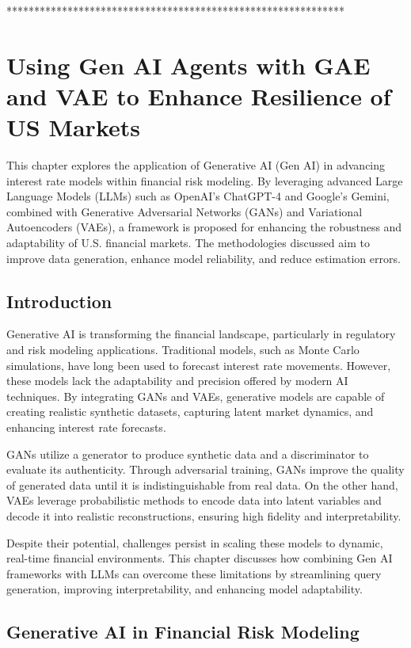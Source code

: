 \documentclass[a4paper,headinclude=on,footinclude=on,12pt,oneside]{scrbook}
\begin{document}
*************************************************************

\chapter{Using Gen AI Agents with GAE and VAE to Enhance Resilience of US Markets}

This chapter explores the application of Generative AI (Gen AI) in advancing interest rate models within financial risk modeling. By leveraging advanced Large Language Models (LLMs) such as OpenAI’s ChatGPT-4 and Google’s Gemini, combined with Generative Adversarial Networks (GANs) and Variational Autoencoders (VAEs), a framework is proposed for enhancing the robustness and adaptability of U.S. financial markets. The methodologies discussed aim to improve data generation, enhance model reliability, and reduce estimation errors.

\section{Introduction}

Generative AI is transforming the financial landscape, particularly in regulatory and risk modeling applications. Traditional models, such as Monte Carlo simulations, have long been used to forecast interest rate movements. However, these models lack the adaptability and precision offered by modern AI techniques. By integrating GANs and VAEs, generative models are capable of creating realistic synthetic datasets, capturing latent market dynamics, and enhancing interest rate forecasts.

GANs utilize a generator to produce synthetic data and a discriminator to evaluate its authenticity. Through adversarial training, GANs improve the quality of generated data until it is indistinguishable from real data. On the other hand, VAEs leverage probabilistic methods to encode data into latent variables and decode it into realistic reconstructions, ensuring high fidelity and interpretability.

Despite their potential, challenges persist in scaling these models to dynamic, real-time financial environments. This chapter discusses how combining Gen AI frameworks with LLMs can overcome these limitations by streamlining query generation, improving interpretability, and enhancing model adaptability.

\section{Generative AI in Financial Risk Modeling}
\end{document}
